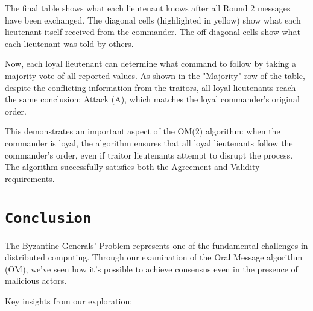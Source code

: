 \documentclass[11pt]{article}
\begin{document}
The final table shows what each lieutenant knows after all Round 2 messages have been exchanged. The diagonal cells (highlighted in yellow) show what each lieutenant itself received from the commander. The off-diagonal cells show what each lieutenant was told by others.

Now, each loyal lieutenant can determine what command to follow by taking a majority vote of all reported values. As shown in the "Majority" row of the table, despite the conflicting information from the traitors, all loyal lieutenants reach the same conclusion: Attack (A), which matches the loyal commander's original order.

This demonstrates an important aspect of the OM(2) algorithm: when the commander is loyal, the algorithm ensures that all loyal lieutenants follow the commander's order, even if traitor lieutenants attempt to disrupt the process. The algorithm successfully satisfies both the Agreement and Validity requirements.

%
%

%

\section*{\texttt{\Large Conclusion}}

The Byzantine Generals' Problem represents one of the fundamental challenges in distributed computing. Through our examination of the Oral Message algorithm (OM), we've seen how it's possible to achieve consensus even in the presence of malicious actors.

Key insights from our exploration:
\end{document}

